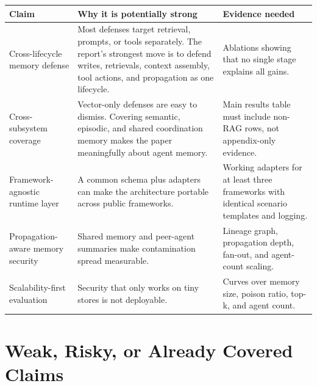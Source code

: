 \documentclass[11pt,oneside]{report}
\begin{document}
\begin{longtable}{|L{0.25\textwidth}|L{0.35\textwidth}|L{0.30\textwidth}|}
\hline
\textbf{Claim} & \textbf{Why it is potentially strong} & \textbf{Evidence needed} \\
\hline
Cross-lifecycle memory defense & Most defenses target retrieval, prompts, or tools separately.
The report's strongest move is to defend writes, retrievals, context assembly, tool actions, and
propagation as one lifecycle. & Ablations showing that no single stage explains all gains. \\
\hline
Cross-subsystem coverage & Vector-only defenses are easy to dismiss. Covering semantic,
episodic, and shared coordination memory makes the paper meaningfully about agent memory. & Main
results table must include non-RAG rows, not appendix-only evidence. \\
\hline
Framework-agnostic runtime layer & A common schema plus adapters can make the architecture
portable across public frameworks. & Working adapters for at least three frameworks with identical
scenario templates and logging. \\
\hline
Propagation-aware memory security & Shared memory and peer-agent summaries make contamination
spread measurable. & Lineage graph, propagation depth, fan-out, and agent-count scaling. \\
\hline
Scalability-first evaluation & Security that only works on tiny stores is not deployable. & Curves
over memory size, poison ratio, top-k, and agent count. \\
\hline
\end{longtable}

\section{Weak, Risky, or Already Covered Claims}
\end{document}
